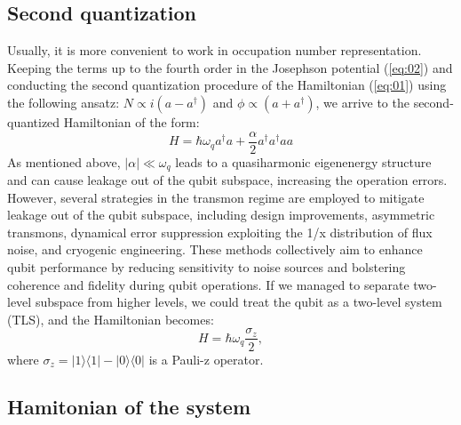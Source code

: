 \documentclass[lettersize,journal]{IEEEtran}
\begin{document}
\subsection{Second quantization}

Usually, it is more convenient to work in occupation number representation.
Keeping the terms up to the fourth order in the Josephson potential (\ref{eq:02}) and conducting the second quantization procedure of the Hamiltonian (\ref{eq:01}) using the following ansatz: $N \propto i(a - a^\dag)$ and $\phi \propto (a + a^\dag)$, we arrive to the second-quantized Hamiltonian of the form:
\begin{equation} \label{eq:03}
    H = \hbar \omega_q a^\dag a + \frac{\alpha}{2} a^\dag a^\dag a a
\end{equation}
As mentioned above, $|\alpha| \ll \omega_q$ leads to a quasiharmonic eigenenergy structure and can cause leakage out of the qubit subspace, increasing the operation errors.
However, several strategies in the transmon regime are employed to mitigate leakage out of the qubit subspace, including design improvements, asymmetric transmons, dynamical error suppression exploiting the 1/x distribution of flux noise, and cryogenic engineering. 
These methods collectively aim to enhance qubit performance by reducing sensitivity to noise sources and bolstering coherence and fidelity during qubit operations.
If we managed to separate two-level subspace from higher levels, we could treat the qubit as a two-level system (TLS), and the Hamiltonian becomes:
\begin{equation} \label{eq:03_1}
    H = \hbar \omega_q \frac{\sigma_z}{2},
\end{equation}
where $\sigma_z = |1\rangle\langle 1 | - | 0 \rangle \langle 0|$ is a Pauli-z operator.

\subsection{Hamitonian of the system}
\end{document}
